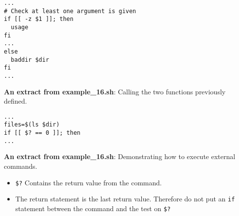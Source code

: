 \documentclass[17pt,dvips]{foils}
\begin{document}
\begin{verbatim}
...
# Check at least one argument is given
if [[ -z $1 ]]; then
  usage
fi
...
else
  baddir $dir
fi
...
\end{verbatim}
{\bf An extract from example\_16.sh}: Calling the two functions previously defined.


\begin{verbatim}
...
files=$(ls $dir)
if [[ $? == 0 ]]; then
...
\end{verbatim}
{\bf An extract from example\_16.sh}: Demonstrating how to execute external commands.
\begin{itemize}
\item \texttt{\$?} Contains the return value from the command.
\item The return statement is the last return value.  Therefore do not put an \texttt{if} statement between the command and the test on \texttt{\$?} 
\end{itemize}
\end{document}

